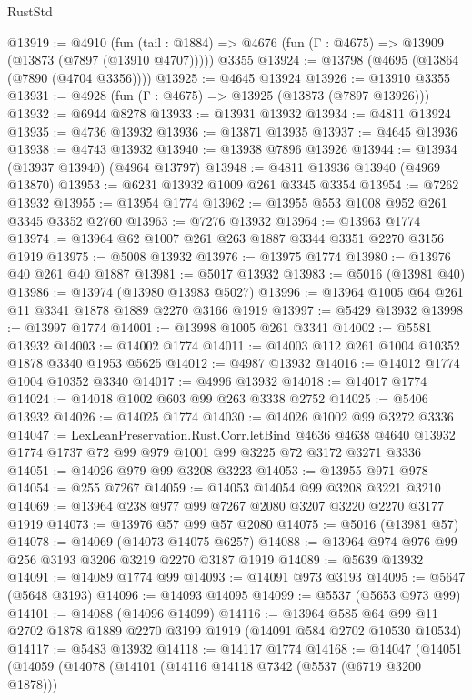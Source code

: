 \begin{lexlean}{RustStd}
\begin{coremodule}
@13919 := @4910
    (fun (tail : @1884) => @4676 (fun (Γ : @4675) => @13909 (@13873 (@7897 (@13910 @4707)))))
    @3355
@13924 := @13798 (@4695 (@13864 (@7890 (@4704 @3356))))
@13925 := @4645 @13924
@13926 := @13910 @3355
@13931 := @4928 (fun (Γ : @4675) => @13925 (@13873 (@7897 @13926)))
@13932 := @6944 @8278
@13933 := @13931 @13932
@13934 := @4811 @13924
@13935 := @4736 @13932
@13936 := @13871 @13935
@13937 := @4645 @13936
@13938 := @4743 @13932
@13940 := @13938 @7896 @13926
@13944 := @13934 (@13937 @13940) (@4964 @13797)
@13948 := @4811 @13936 @13940 (@4969 @13870)
@13953 := @6231 @13932 @1009 @261 @3345 @3354
@13954 := @7262 @13932
@13955 := @13954 @1774
@13962 := @13955 @553 @1008 @952 @261 @3345 @3352 @2760
@13963 := @7276 @13932
@13964 := @13963 @1774
@13974 := @13964 @62 @1007 @261 @263 @1887 @3344 @3351 @2270 @3156 @1919
@13975 := @5008 @13932
@13976 := @13975 @1774
@13980 := @13976 @40 @261 @40 @1887
@13981 := @5017 @13932
@13983 := @5016 (@13981 @40)
@13986 := @13974 (@13980 @13983 @5027)
@13996 := @13964 @1005 @64 @261 @11 @3341 @1878 @1889 @2270 @3166 @1919
@13997 := @5429 @13932
@13998 := @13997 @1774
@14001 := @13998 @1005 @261 @3341
@14002 := @5581 @13932
@14003 := @14002 @1774
@14011 := @14003 @112 @261 @1004 @10352 @1878 @3340 @1953 @5625
@14012 := @4987 @13932
@14016 := @14012 @1774 @1004 @10352 @3340
@14017 := @4996 @13932
@14018 := @14017 @1774
@14024 := @14018 @1002 @603 @99 @263 @3338 @2752
@14025 := @5406 @13932
@14026 := @14025 @1774
@14030 := @14026 @1002 @99 @3272 @3336
@14047 := LexLeanPreservation.Rust.Corr.letBind
    @4636
    @4638
    @4640
    @13932
    @1774
    @1737
    @72
    @99
    @979
    @1001
    @99
    @3225
    @72
    @3172
    @3271
    @3336
@14051 := @14026 @979 @99 @3208 @3223
@14053 := @13955 @971 @978
@14054 := @255 @7267
@14059 := @14053 @14054 @99 @3208 @3221 @3210
@14069 := @13964 @238 @977 @99 @7267 @2080 @3207 @3220 @2270 @3177 @1919
@14073 := @13976 @57 @99 @57 @2080
@14075 := @5016 (@13981 @57)
@14078 := @14069 (@14073 @14075 @6257)
@14088 := @13964 @974 @976 @99 @256 @3193 @3206 @3219 @2270 @3187 @1919
@14089 := @5639 @13932
@14091 := @14089 @1774 @99
@14093 := @14091 @973 @3193
@14095 := @5647 (@5648 @3193)
@14096 := @14093 @14095
@14099 := @5537 (@5653 @973 @99)
@14101 := @14088 (@14096 @14099)
@14116 := @13964
    @585
    @64
    @99
    @11
    @2702
    @1878
    @1889
    @2270
    @3199
    @1919
    (@14091 @584 @2702 @10530 @10534)
@14117 := @5483 @13932
@14118 := @14117 @1774
@14168 := @14047
    (@14051
      (@14059
        (@14078
          (@14101
            (@14116 @14118 @7342 (@5537 (@6719 @3200 @1878)))

\end{coremodule}
\end{lexlean}
